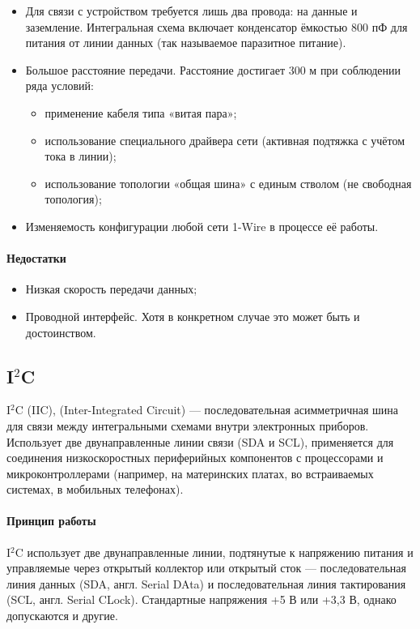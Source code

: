 \documentclass[a4paper,14pt]{extarticle}
\begin{document}
\begin{itemize}
	\item Для связи с устройством требуется лишь два провода: на данные и заземление. Интегральная схема включает конденсатор ёмкостью 800 пФ для питания от линии данных (так называемое паразитное питание).
		\item Большое расстояние передачи. Расстояние достигает 300 м при соблюдении ряда условий:
		\begin{itemize}
			\item применение кабеля типа «витая пара»;
			\item использование специального драйвера сети (активная подтяжка с учётом тока в линии);
			\item использование топологии «общая шина» с единым стволом (не свободная топология);
		\end{itemize}
	
		\item Изменяемость конфигурации любой сети 1-Wire в процессе её работы.
\end{itemize}

\paragraph*{Недостатки}
\begin{itemize}
	\item Низкая скорость передачи данных;
	\item Проводной интерфейс. Хотя в конкретном случае это может быть и достоинством.
\end{itemize}


\subsection*{I${}^2$C }
I${}^2$C (IIC), (Inter-Integrated Circuit)  --- последовательная асимметричная шина для связи между интегральными схемами внутри электронных приборов. Использует две двунаправленные линии связи (SDA и SCL), применяется для соединения низкоскоростных периферийных компонентов с процессорами и микроконтроллерами (например, на материнских платах, во встраиваемых системах, в мобильных телефонах).

\paragraph{Принцип работы}
I${}^2$C использует две двунаправленные линии, подтянутые к напряжению питания и управляемые через открытый коллектор или открытый сток — последовательная линия данных (SDA, англ. Serial DAta) и последовательная линия тактирования (SCL, англ. Serial CLock). Стандартные напряжения +5 В или +3,3 В, однако допускаются и другие.
\end{document}
